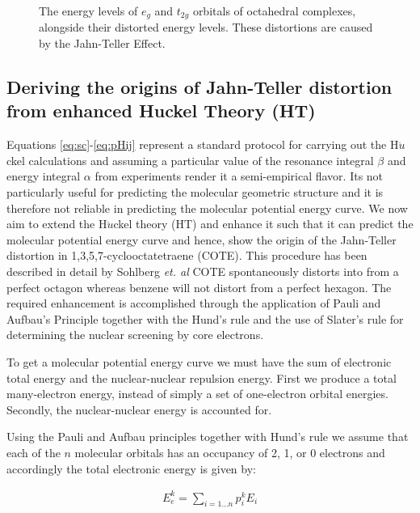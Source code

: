 \documentclass[9pt,twocolumn,twoside]{optica}
\begin{document}
\begin{figure}[htbp]
\centering
{}
\caption{The energy levels of $e_g$ and $t_{2g}$ orbitals of octahedral complexes, alongside their distorted energy levels. These distortions are caused by the Jahn-Teller Effect.}
\label{fig:Jahn}
\end{figure}










\subsection{Deriving the origins of Jahn-Teller distortion from enhanced Huckel Theory (HT)}
Equations \ref{eq:sc}-\ref{eq:pHij} represent a standard protocol for carrying out the H$\ddot{u}$ckel calculations and assuming a particular value of the resonance integral  $\beta$ and  energy integral $\alpha$ from experiments render it a semi-empirical flavor. Its not particularly useful for predicting the molecular geometric structure and it is therefore not reliable in predicting  the molecular potential energy curve. We now aim to extend the H$\ddot{u}$ckel theory (HT) and enhance it such that it can predict the molecular potential energy curve and hence, show the origin of the Jahn-Teller distortion in 1,3,5,7-cyclooctatetraene (COTE). This procedure has been described in detail by Sohlberg \emph{et. al} \cite{wiki1}  COTE spontaneously distorts into from a perfect octagon whereas benzene will not distort from a perfect hexagon. The required enhancement is accomplished through the application of Pauli and Aufbau's Principle together with the Hund's rule and the use of Slater's rule for determining the nuclear screening by core electrons. 

To get a molecular potential energy curve we must have the sum of electronic total energy and the nuclear-nuclear repulsion energy. First we produce a total many-electron energy, instead of simply a set of one-electron orbital energies. Secondly, the nuclear-nuclear energy is accounted for. 

Using the Pauli and Aufbau principles together with Hund’s rule we assume that each of the $n$ molecular orbitals has an occupancy of 2, 1, or 0 electrons and accordingly the total electronic energy is given by:

\begin{align}
E_e^k=\sum_{i=1...n} p_{i}^k E_i
\label{eq:EE}
\end{align}
\end{document}
